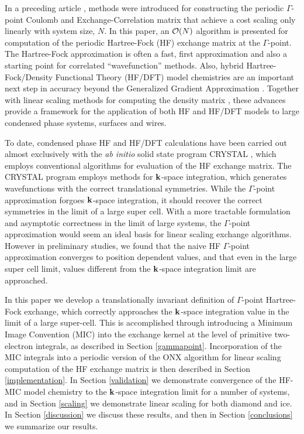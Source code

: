 \documentclass[prb,aps,nobibnotes,twocolumn,doublespace,twocolumngrid,superbib,showpacs]{revtex4}
\begin{document}
In a preceding article \cite{CTymczak04A},  methods were introduced for constructing 
the periodic $\Gamma$-point Coulomb and Exchange-Correlation matrix that 
achieve  a cost  scaling only linearly with system size, $N$.  In this paper, an ${\cal O}(N)$
algorithm is presented for computation of the periodic Hartree-Fock (HF) exchange matrix at the 
$\Gamma$-point.   The Hartree-Fock approximation is often a fast, first 
approximation and also a starting point for correlated ``wavefunction'' methods.  
Also, hybrid Hartree-Fock/Density Functional Theory (HF/DFT) model chemistries are an important next 
step in accuracy beyond the Generalized Gradient Approximation \cite{Gill92,Becke93,VBarone96,CAdamo99}.
Together with linear scaling methods for computing the density matrix \cite{ANiklasson02A,ANiklasson03}, these 
advances provide a framework for the application of both HF and HF/DFT models to large condensed 
phase systems, surfaces and wires.   

To date, condensed phase HF and HF/DFT calculations have been carried out almost 
exclusively with the {\em ab initio} solid state program {\sc CRYSTAL} \cite{RDovesi00,KDoll01}, 
which employs conventional  algorithms for evaluation of the 
HF exchange matrix.  The {\sc CRYSTAL} program employs methods for ${\bf k}$-space integration, 
which generates wavefunctions with the correct translational symmetries.   While the  
$\Gamma$-point approximation forgoes ${\bf k}$-space integration, it should recover the correct 
symmetries in the limit of a large super cell.  With a more tractable formulation and asymptotic 
correctness in the limit of large systems,  the $\Gamma$-point  approximation would seem an 
ideal basis for linear scaling exchange algorithms.   However in preliminary studies, we found 
that the naive HF $\Gamma$-point approximation converges to position dependent values, and that 
even in the large super cell limit,  values different from the ${\bf k}$-space integration limit 
are approached.

In this paper we develop a translationally invariant definition of $\Gamma$-point 
Hartree-Fock exchange, which correctly approaches the ${\bf k}$-space integration value
in the limit of a large super-cell.  This is accomplished through introducing a Minimum 
Image Convention (MIC) into the exchange kernel at the level of primitive two-electron integrals,  
as described in Section \ref{gammapoint}.  Incorporation of the MIC integrals into a periodic 
version of the {\sc ONX} algorithm \cite{ESchwegler97} for linear scaling computation of the HF 
exchange matrix is then described in Section \ref{implementation}.  In Section \ref{validation} 
we demonstrate convergence of the HF-MIC model chemistry to the ${\bf k}$-space integration 
limit for a number of systems, and in Section \ref{scaling} we demonstrate linear scaling 
for both diamond and ice.  In Section \ref{discussion} we discuss these results,
and then in Section \ref{conclusions} we summarize our results.
\end{document}
